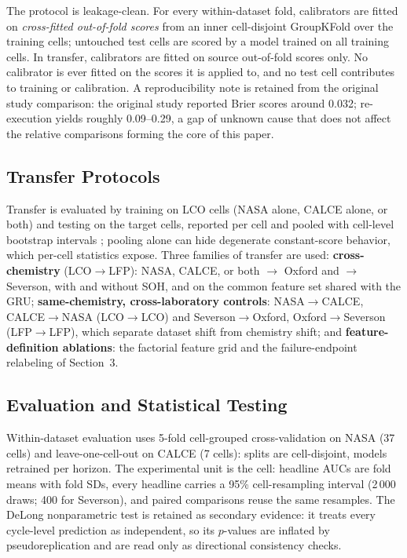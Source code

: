\documentclass[11pt,a4paper]{article}
\begin{document}
The protocol is leakage-clean. For every within-dataset fold, calibrators are fitted on \emph{cross-fitted out-of-fold scores} from an inner cell-disjoint GroupKFold over the training cells; untouched test cells are scored by a model trained on all training cells. In transfer, calibrators are fitted on source out-of-fold scores only. No calibrator is ever fitted on the scores it is applied to, and no test cell contributes to training or calibration. A reproducibility note is retained from the original study comparison: the original study \cite{shikdar2026learning} reported Brier scores around 0.032; re-execution yields roughly 0.09--0.29, a gap of unknown cause that does not affect the relative comparisons forming the core of this paper.

\subsection{Transfer Protocols}
Transfer is evaluated by training on LCO cells (NASA alone, CALCE alone, or both) and testing on the target cells, reported per cell and pooled with cell-level bootstrap intervals \cite{efron1979bootstrap}; pooling alone can hide degenerate constant-score behavior, which per-cell statistics expose. Three families of transfer are used: \textbf{cross-chemistry} (LCO$\to$LFP): NASA, CALCE, or both $\to$ Oxford and $\to$ Severson, with and without SOH, and on the common feature set shared with the GRU; \textbf{same-chemistry, cross-laboratory controls}: NASA$\to$CALCE, CALCE$\to$NASA (LCO$\to$LCO) and Severson$\to$Oxford, Oxford$\to$Severson (LFP$\to$LFP), which separate dataset shift from chemistry shift; and \textbf{feature-definition ablations}: the factorial feature grid and the failure-endpoint relabeling of Section~3.

\subsection{Evaluation and Statistical Testing}
\label{sec:eval}
Within-dataset evaluation uses 5-fold cell-grouped cross-validation on NASA (37 cells) and leave-one-cell-out on CALCE (7 cells): splits are cell-disjoint, models retrained per horizon. The experimental unit is the cell: headline AUCs \cite{hanley1982meaning} are fold means with fold SDs, every headline carries a 95\% cell-resampling interval (2\,000 draws; 400 for Severson), and paired comparisons reuse the same resamples. The DeLong nonparametric test \cite{delong1988comparing} is retained as secondary evidence: it treats every cycle-level prediction as independent, so its $p$-values are inflated by pseudoreplication and are read only as directional consistency checks.
\end{document}
